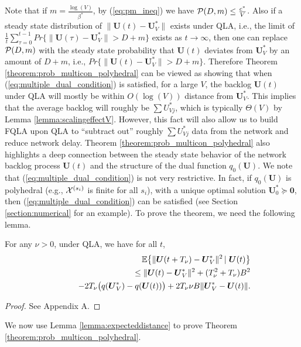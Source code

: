\documentclass[journal]{IEEEtran}
\newcommand{\prob}{Pr}
\newcommand{\expect}[1]{\mathbb{E}\big\{#1\big\}}
\newcommand{\bv}[1]{{\boldsymbol{#1} }}
\newcommand{\script}[1]{{{\cal{#1} }}}
\begin{document}
Note that if $m=\frac{\log(V)}{\beta^*}$, by (\ref{eq:pm_ineq}) we have $\script{P}(D, m)\leq\frac{c^*}{V}$. 
Also if a steady state distribution of $\|\bv{U}(t)-\bv{U}_V^*\|$ exists under QLA, i.e., the limit of $\frac{1}{t}\sum_{\tau=0}^{t-1}\prob\{\|\bv{U}(\tau)-\bv{U}_V^*\|>D+m\}$ exists as $t\rightarrow\infty$,  then one can replace $\script{P}(D, m)$ with the steady state probability that $\bv{U}(t)$ deviates from $\bv{U}^*_V$ by an amount of $D+m$, i.e., $\prob\{\|\bv{U}(t)-\bv{U}_V^*\|>D+m\}$. Therefore Theorem \ref{theorem:prob_multicon_polyhedral} can be viewed as showing that when (\ref{eq:multiple_dual_condition}) is satisfied, for a large $V$, the backlog $\bv{U}(t)$ under QLA will mostly be within $O(\log(V))$ distance from $\bv{U}_V^*$. This implies that the average backlog will roughly be $\sum U^*_{Vj}$, which is typically $\Theta (V)$ by Lemma \ref{lemma:scalingeffectV}. However, this fact will also allow us to build FQLA upon QLA to ``subtract out'' roughly $\sum U^*_{Vj}$ data from the network and reduce network delay. Theorem \ref{theorem:prob_multicon_polyhedral} also highlights a deep connection between the steady state behavior of the network backlog process $\bv{U}(t)$ and the structure of the dual function $q_0(\bv{U})$. We note that (\ref{eq:multiple_dual_condition}) is not very restrictive. In fact, if $q_0(\bv{U})$ is polyhedral (e.g., $\script{X}^{(s_i)}$ is finite for all $s_i$), with a unique optimal solution $\bv{U}^*_0\succeq\bv{0}$, then (\ref{eq:multiple_dual_condition}) can be satisfied (see Section \ref{section:numerical} for an example). To prove the theorem, we need the following lemma.

\begin{lemma}\label{lemma:expecteddistance}
For any $\nu>0$, under QLA, we have for all $t$,
\begin{eqnarray}
&&\hspace{-.3in}\expect{\|\bv{U}(t+T_{\nu})-\bv{U}^*_V\|^2\left |\right. \bv{U}(t)}\label{eq:qla_general_expecteddist}\\
&&\qquad\leq \|\bv{U}(t)-\bv{U}^*_V\|^2 + (T^2_{\nu}+T_{\nu})B^2\nonumber\\
&&\qquad-2T_{\nu}\big(q(\bv{U}^*_V)-q(\bv{U}(t))\big)+2T_{\nu}\nu B\|\bv{U}^*_V-\bv{U}(t)\|.\nonumber
\end{eqnarray}
\end{lemma}
\begin{proof}
See Appendix A.
\end{proof}

We now use Lemma \ref{lemma:expecteddistance} to prove Theorem \ref{theorem:prob_multicon_polyhedral}. 
\end{document}
